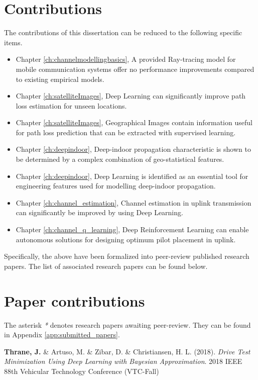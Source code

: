 \section*{Contributions}

The contributions of this dissertation can be reduced to the following specific items. 

\begin{itemize}
    \item Chapter \ref{ch:channelmodellingbasics}, A provided Ray-tracing model for mobile communication systems offer no performance improvements compared to existing empirical models.
    \item Chapter \ref{ch:satelliteImages}, Deep Learning can significantly improve path loss estimation for unseen locations.
    \item Chapter \ref{ch:satelliteImages}, Geographical Images contain information useful for path loss prediction that can be extracted with supervised learning.
    \item Chapter \ref{ch:deepindoor}, Deep-indoor propagation characteristic is shown to be determined by a complex combination of geo-statistical features.
    \item Chapter \ref{ch:deepindoor}, Deep Learning is identified as an essential tool for engineering features used for modelling deep-indoor propagation.
    \item Chapter \ref{ch:channel_estimation}, Channel estimation in uplink transmission can significantly be improved by using Deep Learning.
    \item Chapter \ref{ch:channel_q_learning}, Deep Reinforcement Learning can enable autonomous solutions for designing optimum pilot placement in uplink.
\end{itemize}

\noindent Specifically, the above have been formalized into peer-review published research papers. The list of associated research papers can be found below.


\section*{Paper contributions}

The asterisk \emph{*} denotes research papers awaiting peer-review. They can be found in Appendix \ref{app:submitted_papers}.

\vspace{2em}

\noindent \textbf{Thrane, J.} \&  Artuso, M. \&  Zibar, D. \&  Christiansen, H. L. (2018). \textit{Drive Test Minimization Using Deep Learning with Bayesian Approximation}. 2018 IEEE 88th Vehicular Technology Conference (VTC-Fall) \cite{Thrane2018DriveApproximation}

